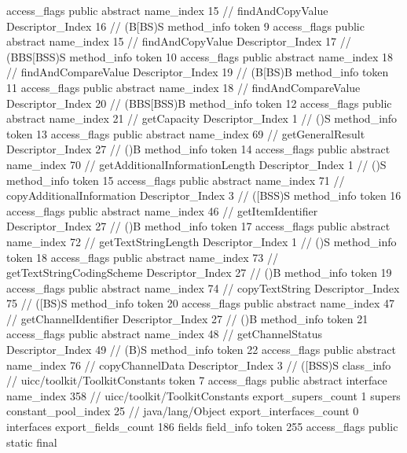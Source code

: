 {{{{{					access_flags	public abstract
					name_index	15		// findAndCopyValue
					Descriptor_Index	16		// (B[BS)S
				}
				method_info {
					token	9
					access_flags	public abstract
					name_index	15		// findAndCopyValue
					Descriptor_Index	17		// (BBS[BSS)S
				}
				method_info {
					token	10
					access_flags	public abstract
					name_index	18		// findAndCompareValue
					Descriptor_Index	19		// (B[BS)B
				}
				method_info {
					token	11
					access_flags	public abstract
					name_index	18		// findAndCompareValue
					Descriptor_Index	20		// (BBS[BSS)B
				}
				method_info {
					token	12
					access_flags	public abstract
					name_index	21		// getCapacity
					Descriptor_Index	1		// ()S
				}
				method_info {
					token	13
					access_flags	public abstract
					name_index	69		// getGeneralResult
					Descriptor_Index	27		// ()B
				}
				method_info {
					token	14
					access_flags	public abstract
					name_index	70		// getAdditionalInformationLength
					Descriptor_Index	1		// ()S
				}
				method_info {
					token	15
					access_flags	public abstract
					name_index	71		// copyAdditionalInformation
					Descriptor_Index	3		// ([BSS)S
				}
				method_info {
					token	16
					access_flags	public abstract
					name_index	46		// getItemIdentifier
					Descriptor_Index	27		// ()B
				}
				method_info {
					token	17
					access_flags	public abstract
					name_index	72		// getTextStringLength
					Descriptor_Index	1		// ()S
				}
				method_info {
					token	18
					access_flags	public abstract
					name_index	73		// getTextStringCodingScheme
					Descriptor_Index	27		// ()B
				}
				method_info {
					token	19
					access_flags	public abstract
					name_index	74		// copyTextString
					Descriptor_Index	75		// ([BS)S
				}
				method_info {
					token	20
					access_flags	public abstract
					name_index	47		// getChannelIdentifier
					Descriptor_Index	27		// ()B
				}
				method_info {
					token	21
					access_flags	public abstract
					name_index	48		// getChannelStatus
					Descriptor_Index	49		// (B)S
				}
				method_info {
					token	22
					access_flags	public abstract
					name_index	76		// copyChannelData
					Descriptor_Index	3		// ([BSS)S
				}
			}
		}
		class_info {		// uicc/toolkit/ToolkitConstants
			token	7
			access_flags	public abstract interface
			name_index	358		// uicc/toolkit/ToolkitConstants
			export_supers_count	1
			supers {
				constant_pool_index	25		// java/lang/Object
			}
			export_interfaces_count	0
			interfaces {
			}
			export_fields_count	186
			fields {
			field_info {
				token	255
				access_flags	public static final
}}}}}
